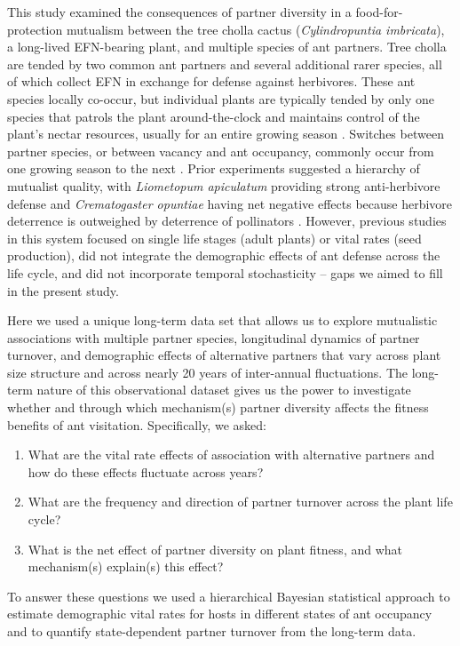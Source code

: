 \documentclass[11pt]{article}
\newcommand{\revise}[1]{{\color{blue}{#1}}}
\begin{document}
This study examined the consequences of partner diversity in a food-for-protection mutualism between the tree cholla cactus (\textit{Cylindropuntia imbricata}), a long-lived EFN-bearing plant, and multiple species of ant partners.
Tree cholla are tended by two common ant partners and several additional rarer species, all of which collect EFN in exchange for defense against herbivores.
These ant species locally co-occur, but individual plants are typically tended by only one species that patrols the plant around-the-clock and maintains control of the plant's nectar resources, usually for an entire growing season \citep{Ohm2014, Donald2022}. 
Switches between partner species, or between vacancy and ant occupancy, commonly occur from one growing season to the next \citep{Miller2007}. 
Prior experiments suggested a hierarchy of mutualist quality, with \textit{Liometopum apiculatum} providing strong anti-herbivore defense and \textit{Crematogaster opuntiae} having net negative effects because herbivore deterrence is outweighed by deterrence of pollinators \citep{Miller2007,Ohm2014}.  
However, previous studies in this system focused on single life stages (adult plants) or vital rates (seed production), did not integrate the demographic effects of ant defense across the life cycle, and did not incorporate temporal stochasticity -- gaps we aimed to fill in the present study. 

Here we used a unique long-term data set that allows us to explore mutualistic associations with multiple partner species, longitudinal dynamics of partner turnover, and demographic effects of alternative partners that vary across plant size structure and across nearly 20 years of inter-annual fluctuations. 
The long-term nature of this observational dataset gives us the power to investigate whether and through which mechanism(s) partner diversity affects the fitness benefits of ant visitation. 
Specifically, we asked:
	\begin{enumerate}	
		\item{What are the vital rate effects of association with alternative partners and how do these effects fluctuate across years?}
		\item{What are the frequency and direction of partner turnover across the plant life cycle?}	
		\item{What is the net effect of partner diversity on plant fitness, and what mechanism(s) explain(s) this effect?}
	\end{enumerate}
To answer these questions we used a hierarchical Bayesian statistical approach to estimate demographic vital rates for hosts in different states of ant occupancy and to quantify state-dependent partner turnover from the long-term data. 
\revise{We then built a stochastic, multi-state integral projection model (IPM) which combines diverse effects on vital rates and pathways of partner turnover. 
Finally, we used the model to conduct simulation `experiments' that quantify plant fitness under different scenarios of partner richness, composition, and synchrony. }
\end{document}
